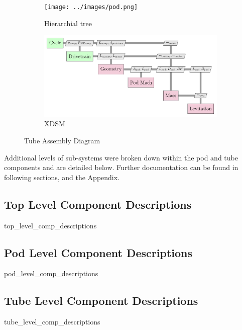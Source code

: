 \begin{figure}
\centering
\begin{subfigure}{.5\textwidth}
  \centering
  \texttt{[image: ../images/pod.png]}
  \caption{Hierarchial tree}
  \label{fig:tree:pod}
\end{subfigure}%
\begin{subfigure}{.5\textwidth}
  \centering
  \includegraphics{../images/xdsm/pod.pdf}
  \caption{XDSM}
  \label{fig:xdsm:pod}
\end{subfigure}
\caption{Tube Assembly Diagram}
\label{fig:pod}
\end{figure}

Additional levels of sub-systems were broken down within the pod and tube components and are detailed below.
Further documentation can be found in following sections, and the Appendix.

\subsection{Top Level Component Descriptions}
	{top_level_comp_descriptions}
\subsection{Pod Level Component Descriptions}
	{pod_level_comp_descriptions}
\subsection{Tube Level Component Descriptions}
	{tube_level_comp_descriptions}


